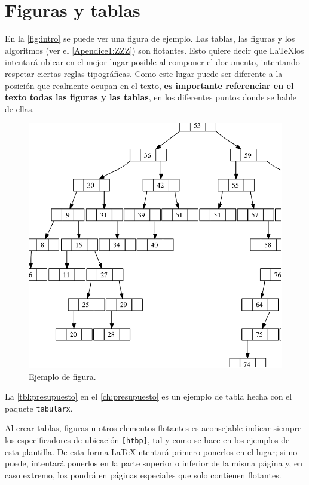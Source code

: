 \section{Figuras y tablas}

\noindent En la \autoref{fig:intro} se puede ver una figura de ejemplo. Las tablas, las figuras y los algoritmos (ver el \autoref{Apendice1:ZZZ}) son flotantes. Esto quiere decir que \LaTeX los intentará ubicar en el mejor lugar posible al componer el documento, intentando respetar ciertas reglas tipográficas. Como este lugar puede ser diferente a la posición que realmente ocupan en el texto, \textbf{es importante referenciar en el texto todas las figuras y las tablas}, en los diferentes puntos donde se hable de ellas.

\begin{figure}[htbp]
   \centering
   \includegraphics[width=0.8\linewidth]{images/figura_1}
   \caption{Ejemplo de figura.}
   \label{fig:intro}
\end{figure}

La \autoref{tbl:presupuesto} en el \autoref{ch:presupuesto} es un ejemplo de tabla hecha con el paquete \texttt{tabularx}.

Al crear tablas, figuras u otros elementos flotantes es aconsejable indicar siempre los especificadores de ubicación \texttt{[htbp]}, tal y como se hace en los ejemplos de esta plantilla. De esta forma \LaTeX intentará primero ponerlos en el lugar; si no puede, intentará ponerlos en la parte superior o inferior de la misma página y, en caso extremo, los pondrá en páginas especiales que solo contienen flotantes.

